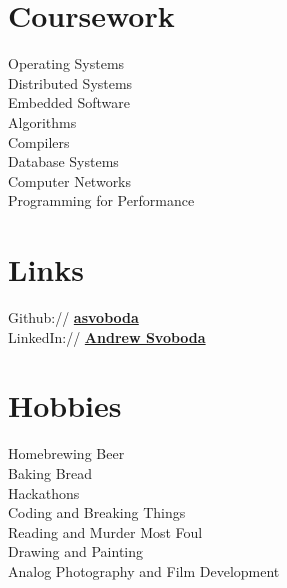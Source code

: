 \documentclass[letterpaper]{deedy-resume} %
\begin{document}
\begin{minipage}[t]{0.33\textwidth}

\section{Coursework}

Operating Systems \\
Distributed Systems \\
Embedded Software \\
Algorithms \\
Compilers \\
Database Systems \\
Computer Networks \\
Programming for Performance 


\section{Links} 

Github:// \href{https://github.com/asvoboda}{\bf asvoboda} \\
LinkedIn:// \href{https://ca.linkedin.com/pub/andrew-svoboda/80/645/667}{\bf Andrew Svoboda}


\section{Hobbies}

Homebrewing Beer \\
Baking Bread \\
Hackathons \\
Coding and Breaking Things \\
Reading and Murder Most Foul \\
Drawing and Painting \\
Analog Photography and Film Development

\sectionspace %


\end{minipage} %
\hfill
\end{document}
